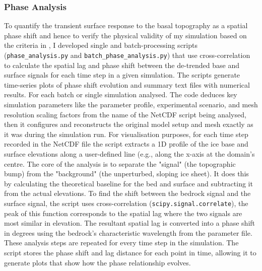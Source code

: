 \subsubsection{Phase Analysis}
To quantify the transient surface response to the basal topography as a spatial phase shift and hence to verify the physical validity of my simulation based on the criteria in \cite{Budd_1970}, I developed single and batch-processing scripts (\texttt{phase\_analysis.py} and \texttt{batch\_phase\_analysis.py}) that use cross-correlation to calculate the spatial lag and phase shift between the de-trended base and surface signals for each time step in a given simulation.
The scripts generate time-series plots of phase shift evolution and summary text files with numerical results. For each batch or single simulation analysed.
The code deduces key simulation parameters like the parameter profile, experimental scenario, and mesh resolution scaling factors from the name of the NetCDF script being analysed, then it configures and reconstructs the original model setup and mesh exactly as it was during the simulation run. For visualisation purposes, for each time step recorded in the NetCDF file the script extracts a 1D profile of the ice base and surface elevations along a user-defined line (e.g., along the x-axis at the domain's centre. The core of the analysis is to separate the "signal" (the topographic bump) from the "background" (the unperturbed, sloping ice sheet). It does this by calculating the theoretical baseline for the bed and surface and subtracting it from the actual elevations. To find the shift between the bedrock signal and the surface signal, the script uses cross-correlation (\texttt{scipy.signal.correlate}), the peak of this function corresponds to the spatial lag where the two signals are most similar in elevation.
The resultant spatial lag is converted into a phase shift in degrees using the bedrock's characteristic wavelength from the parameter file. These analysis steps are repeated for every time step in the simulation. The script stores the phase shift and lag distance for each point in time, allowing it to generate plots that show how the phase relationship evolves.
